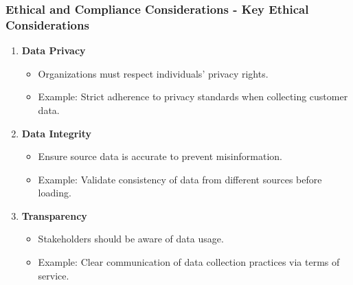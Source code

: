 \documentclass[aspectratio=169]{beamer}
\begin{document}
\begin{frame}[fragile]
    \frametitle{Ethical and Compliance Considerations - Key Ethical Considerations}
    \begin{enumerate}
        \item \textbf{Data Privacy}
            \begin{itemize}
                \item Organizations must respect individuals' privacy rights.
                \item Example: Strict adherence to privacy standards when collecting customer data.
            \end{itemize}
        \item \textbf{Data Integrity}
            \begin{itemize}
                \item Ensure source data is accurate to prevent misinformation.
                \item Example: Validate consistency of data from different sources before loading.
            \end{itemize}
        \item \textbf{Transparency}
            \begin{itemize}
                \item Stakeholders should be aware of data usage.
                \item Example: Clear communication of data collection practices via terms of service.
            \end{itemize}
    \end{enumerate}
\end{frame}
\end{document}
